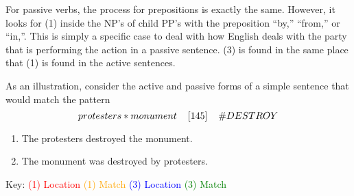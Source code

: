 \documentclass[11pt]{article}
\begin{document}
For passive verbs, the process for prepositions is exactly the same. However, it 
looks for (1) inside the NP's of child PP's with the preposition ``by,'' ``from,'' or 
``in,''. This is simply a specific case to deal with how English deals with the 
party that is performing the action in a passive sentence. (3) is found in the 
same place that (1) is found in the active sentences. 

As an illustration, consider the active and passive forms of a simple sentence that would match the pattern
$$ protesters * monument \hspace{4mm} [145]\hspace{4mm} \# DESTROY  $$
 \begin{enumerate} \item The protesters destroyed the 
monument.
\vspace{10mm}

                    
                    
   \vspace{10mm}                 
      \newpage              
\item The monument was destroyed by protesters. 

                   
           \vspace{10mm}         

\end{enumerate}

Key: \textcolor{red}{(1) Location} \textcolor{orange}{(1) Match} 
\textcolor{blue}{(3) Location} \textcolor{green}{(3) Match}
\end{document}
